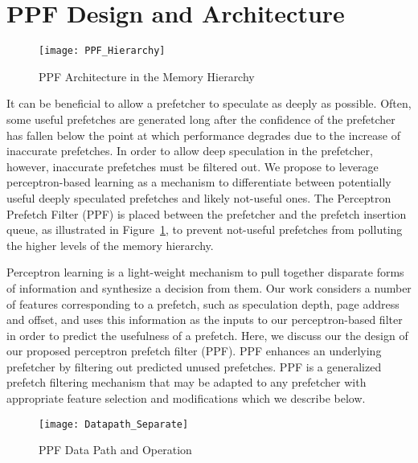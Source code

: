 \section{PPF Design and Architecture}
\label{Arch}

\begin{figure}
  \begin{center}
  \texttt{[image: PPF\_Hierarchy]}
  \caption{PPF Architecture in the Memory Hierarchy}
  \label{fig:PPF_Hierarchy}
  \end{center}
\end{figure}

It can be beneficial to allow a prefetcher to speculate as deeply as
possible. Often, some useful prefetches are generated long after the
confidence of the prefetcher has fallen below the point at which
performance degrades due to the increase of inaccurate prefetches.  In
order to allow deep speculation in the prefetcher, however, inaccurate
prefetches must be filtered out.  We propose to leverage
perceptron-based learning as a mechanism to differentiate between
potentially useful deeply speculated prefetches and likely not-useful
ones. The Perceptron Prefetch Filter (PPF) is placed between the
prefetcher and the prefetch insertion queue, as illustrated in
Figure~\ref{fig:PPF_Hierarchy}, to prevent not-useful prefetches from
polluting the higher levels of the memory hierarchy.

Perceptron learning is a light-weight mechanism to pull together
disparate forms of information and synthesize a decision from
them. Our work considers a number of features corresponding to a
prefetch, such as speculation depth, page address and offset, and uses
this information as the inputs to our perceptron-based filter in order
to predict the usefulness of a prefetch.  Here, we discuss our the
design of our proposed perceptron prefetch filter (PPF).  PPF enhances
{\color{red}an underlying prefetcher} by filtering out predicted unused prefetches. 
PPF is a generalized prefetch filtering mechanism that may be adapted 
to any prefetcher with appropriate feature selection and modifications 
which we describe below.

\begin{figure}[ht]
  \begin{center}
  \texttt{[image: Datapath\_Separate]}
  \caption{PPF Data Path and Operation}
  \label{fig:PPF_Datapath}
  \end{center}
\end{figure}

